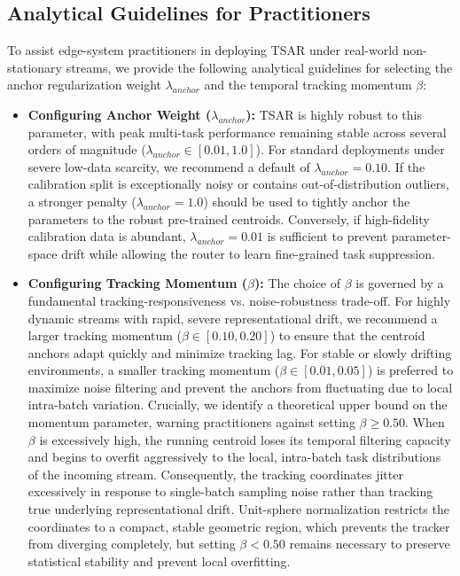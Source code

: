 \subsection{Analytical Guidelines for Practitioners}
To assist edge-system practitioners in deploying TSAR under real-world non-stationary streams, we
provide the following analytical guidelines for selecting the anchor regularization weight
$\lambda_{anchor}$ and the temporal tracking momentum $\beta$:
\begin{itemize}
    \item \textbf{Configuring Anchor Weight ($\lambda_{anchor}$):} TSAR is highly robust to this
parameter, with peak multi-task performance remaining stable across several orders of magnitude
($\lambda_{anchor} \in [0.01, 1.0]$). For standard deployments under severe low-data scarcity, we
recommend a default of $\lambda_{anchor} = 0.10$. If the calibration split is exceptionally noisy or
contains out-of-distribution outliers, a stronger penalty ($\lambda_{anchor} = 1.0$) should be used
to tightly anchor the parameters to the robust pre-trained centroids. Conversely, if high-fidelity
calibration data is abundant, $\lambda_{anchor} = 0.01$ is sufficient to prevent parameter-space
drift while allowing the router to learn fine-grained task suppression.
    \item \textbf{Configuring Tracking Momentum ($\beta$):} The choice of $\beta$ is governed by a
fundamental tracking-responsiveness vs. noise-robustness trade-off. For highly dynamic streams with
rapid, severe representational drift, we recommend a larger tracking momentum ($\beta \in [0.10,
0.20]$) to ensure that the centroid anchors adapt quickly and minimize tracking lag. For stable or
slowly drifting environments, a smaller tracking momentum ($\beta \in [0.01, 0.05]$) is preferred to
maximize noise filtering and prevent the anchors from fluctuating due to local intra-batch
variation. Crucially, we identify a theoretical upper bound on the momentum parameter, warning practitioners against setting $\beta \ge 0.50$. When $\beta$ is excessively high, the running centroid loses its temporal filtering capacity and begins to overfit aggressively to the local, intra-batch task distributions of the incoming stream. Consequently, the tracking coordinates jitter excessively in response to single-batch sampling noise rather than tracking true underlying representational drift. Unit-sphere normalization restricts the coordinates to a compact, stable geometric region, which prevents the tracker from diverging completely, but setting $\beta < 0.50$ remains necessary to preserve statistical stability and prevent local overfitting.
\end{itemize}

